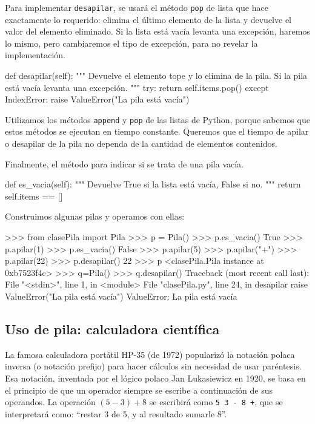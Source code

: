 Para implementar \lstinline!desapilar!, se usará el método \lstinline!pop!
de lista que hace exactamente lo requerido: elimina el último elemento de
la lista y devuelve el valor del elemento eliminado. Si la lista está vacía
levanta una excepción, haremos lo mismo, pero cambiaremos el tipo de
excepción, para no revelar la implementación.

\begin{codigo-python-sn}
    def desapilar(self):
        """ Devuelve el elemento tope y lo elimina de la pila.
            Si la pila está vacía levanta una excepción. """
        try:
            return self.items.pop()
        except IndexError:
            raise ValueError("La pila está vacía")
\end{codigo-python-sn}

\begin{observacion}
Utilizamos los métodos \lstinline!append! y \lstinline!pop! de las listas de
Python, porque sabemos que estos métodos se ejecutan en tiempo constante.
Queremos que el tiempo de apilar o desapilar de la pila no dependa de la
cantidad de elementos contenidos.
\end{observacion}

Finalmente, el método para indicar si se trata de una pila vacía.

\begin{codigo-python-sn}
    def es_vacia(self):
        """ Devuelve True si la lista está vacía, False si no. """
        return self.items == []
\end{codigo-python-sn}

Construimos algunas pilas y operamos con ellas:

\begin{codigo-python-sn}
>>> from clasePila import Pila
>>> p = Pila()
>>> p.es_vacia()
True
>>> p.apilar(1)
>>> p.es_vacia()
False
>>> p.apilar(5)
>>> p.apilar("+")
>>> p.apilar(22)
>>> p.desapilar()
22
>>> p
<clasePila.Pila instance at 0xb7523f4c>
>>> q=Pila()
>>> q.desapilar()
Traceback (most recent call last):
  File "<stdin>", line 1, in <module>
  File "clasePila.py", line 24, in desapilar
    raise ValueError("La pila está vacía")
ValueError: La pila está vacía
\end{codigo-python-sn}

\subsection{Uso de pila: calculadora científica}

La famosa calculadora portátil HP-35 (de 1972) popularizó la notación
polaca inversa (o notación prefijo) para hacer cálculos sin necesidad de
usar paréntesis. Esa notación, inventada por el lógico polaco Jan
Lukasiewicz en 1920, se basa en el principio de que un operador siempre se
escribe a continuación de sus operandos. La operación $(5-3)+8$ se
escribirá como \lstinline|5 3 - 8 +|, que se interpretará como: ``restar 3
de 5, y al resultado sumarle 8''.


